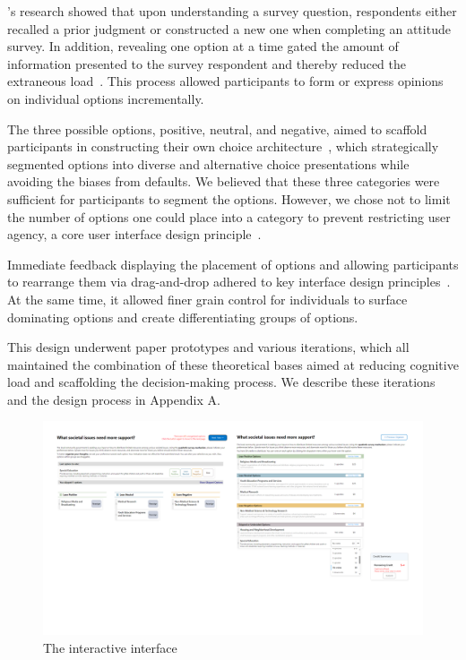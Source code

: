 \textcite{strackThinkingJudgingCommunicating1987}'s research showed that upon understanding a survey question, respondents either recalled a prior judgment or constructed a new one when completing an attitude survey. In addition, revealing one option at a time gated the amount of information presented to the survey respondent and thereby reduced the extraneous load~\cite{swellerCognitiveLoadTheory2011}. This process allowed participants to form or express opinions on individual options incrementally.

The three possible options, positive, neutral, and negative, aimed to scaffold participants in constructing their own choice architecture~\cite{munscherReviewTaxonomyChoice2016, thalerNudgeImprovingDecisions2008a}, which strategically segmented options into diverse and alternative choice presentations while avoiding the biases from defaults. We believed that these three categories were sufficient for participants to segment the options. However, we chose not to limit the number of options one could place into a category to prevent restricting user agency, a core user interface design principle~\cite{norman2013design}.

Immediate feedback displaying the placement of options and allowing participants to rearrange them via drag-and-drop adhered to key interface design principles~\cite{norman2013design}. At the same time, it allowed finer grain control for individuals to surface dominating options and create differentiating groups of options.

This design underwent paper prototypes and various iterations, which all maintained the combination of these theoretical bases aimed at reducing cognitive load and scaffolding the decision-making process. We describe these iterations and the design process in Appendix A.
\begin{figure}[ht]
    \centering
    \includegraphics[width=1\textwidth]{content/image/interface.png}
    \caption{The interactive interface}
    \label{fig:interactiveInterface}
\end{figure}

